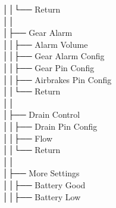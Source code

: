 │\hspace{2em}│\hspace{2em}└── Return \\
│\hspace{2em}│\hspace{2em} \\
│\hspace{2em}├── Gear Alarm \\
│\hspace{2em}│\hspace{2em}├── Alarm Volume \\
│\hspace{2em}│\hspace{2em}├── Gear Alarm Config \\
│\hspace{2em}│\hspace{2em}├── Gear Pin Config \\
│\hspace{2em}│\hspace{2em}├── Airbrakes Pin Config \\
│\hspace{2em}│\hspace{2em}└── Return \\
│\hspace{2em}│\hspace{2em} \\
│\hspace{2em}├── Drain Control \\
│\hspace{2em}│\hspace{2em}├── Drain Pin Config \\
│\hspace{2em}│\hspace{2em}├── Flow \\
│\hspace{2em}│\hspace{2em}└── Return \\
│\hspace{2em}│\hspace{2em} \\
│\hspace{2em}├── More Settings \\
│\hspace{2em}│\hspace{2em}├── Battery Good \\
│\hspace{2em}│\hspace{2em}├── Battery Low \\

